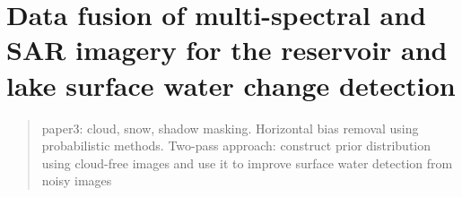 \chapter{Data fusion of multi-spectral and SAR imagery for the reservoir and lake surface water change detection}
\label{ch4}

\begin{abstract}
paper3: cloud, snow, shadow masking. 
Horizontal bias removal using probabilistic methods. Two-pass approach: construct prior distribution using cloud-free images and use it to improve surface water detection from noisy images
\end{abstract}

\newpage

